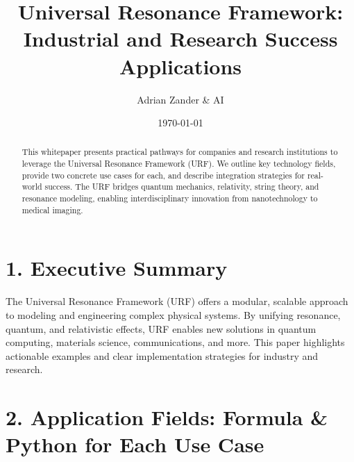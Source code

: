 \documentclass[12pt]{article}
\title{\textbf{Universal Resonance Framework:\\
Industrial and Research Success Applications}}
\author{Adrian Zander \& AI}
\date{\today}
\begin{document}
\maketitle

\begin{abstract}
This whitepaper presents practical pathways for companies and research institutions to leverage the Universal Resonance Framework (URF). We outline key technology fields, provide two concrete use cases for each, and describe integration strategies for real-world success. The URF bridges quantum mechanics, relativity, string theory, and resonance modeling, enabling interdisciplinary innovation from nanotechnology to medical imaging.
\end{abstract}

\clearpage

\section*{1. Executive Summary}
The Universal Resonance Framework (URF) offers a modular, scalable approach to modeling and engineering complex physical systems. By unifying resonance, quantum, and relativistic effects, URF enables new solutions in quantum computing, materials science, communications, and more. This paper highlights actionable examples and clear implementation strategies for industry and research.

\clearpage

\section*{2. Application Fields: Formula \& Python for Each Use Case}
\end{document}
